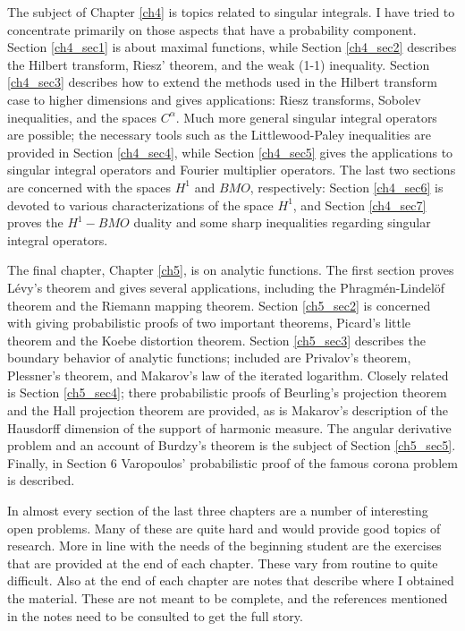 The subject of Chapter \ref{ch4} is topics related to singular integrals. I have tried to concentrate primarily on those aspects that have a probability component. Section \ref{ch4_sec1} is about maximal functions, while Section \ref{ch4_sec2} describes the Hilbert transform, Riesz' theorem, and the weak (1-1) inequality. Section \ref{ch4_sec3} describes how to extend the methods used in the Hilbert transform case to higher dimensions and gives applications: Riesz transforms, Sobolev inequalities, and the spaces $C^\alpha$. Much more general singular integral operators are possible; the necessary tools such as the Littlewood-Paley inequalities are provided in Section \ref{ch4_sec4}, while Section \ref{ch4_sec5} gives the applications to singular integral operators and Fourier multiplier operators. The last two sections are concerned with the spaces $H^1$ and $BMO$, respectively: Section \ref{ch4_sec6} is devoted to various characterizations of the space $H^1$, and Section \ref{ch4_sec7} proves the $H^1-BMO$ duality and some sharp inequalities regarding singular integral operators.

The final chapter, Chapter \ref{ch5}, is on analytic functions. The first section proves L\'evy's theorem and gives several applications, including the Phragm\'en-Lindel\"of theorem and the Riemann mapping theorem. Section \ref{ch5_sec2} is concerned with giving probabilistic proofs of two important theorems, Picard's little theorem and the Koebe distortion theorem. Section \ref{ch5_sec3} describes the boundary behavior of analytic functions; included are Privalov's theorem, Plessner's theorem, and Makarov's law of the iterated logarithm. Closely related is Section \ref{ch5_sec4}; there probabilistic proofs of Beurling's projection theorem and the Hall projection theorem are provided, as is Makarov's description of the Hausdorff dimension of the support of harmonic measure. The angular derivative problem and an account of Burdzy's theorem is the subject of Section \ref{ch5_sec5}. Finally, in Section 6 Varopoulos' probabilistic proof of the famous corona problem is described.

In almost every section of the last three chapters are a number of interesting open problems. Many of these are quite hard and would provide good topics of research. More in line with the needs of the beginning student are the exercises that are provided at the end of each chapter. These vary from routine to quite difficult. Also at the end of each chapter are notes that describe where I obtained the material. These are not meant to be complete, and the references mentioned in the notes need to be consulted to get the full story.

